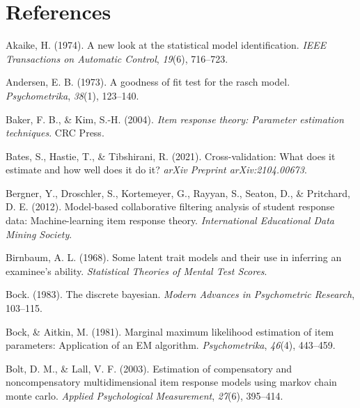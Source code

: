 \documentclass[
  english,
  man,floatsintext]{apa7}
\newlength{\cslhangindent}
\newlength{\cslentryspacingunit} %
\newenvironment{CSLReferences}[2] %
 {%
  \setlength{\parindent}{0pt}
  \ifodd #1
  \let\oldpar\par
  \def\par{\hangindent=\cslhangindent\oldpar}
  \fi
  \setlength{\parskip}{#2\cslentryspacingunit}
 }%
 {}
\begin{document}
\clearpage

\hypertarget{references}{%
\section{References}\label{references}}

\begingroup
\setlength{\parindent}{-0.5in}
\setlength{\leftskip}{0.5in}

\hypertarget{refs}{}
\begin{CSLReferences}{1}{0}
\leavevmode{}%
Akaike, H. (1974). A new look at the statistical model identification. \emph{IEEE Transactions on Automatic Control}, \emph{19}(6), 716--723.

\leavevmode{}%
Andersen, E. B. (1973). A goodness of fit test for the rasch model. \emph{Psychometrika}, \emph{38}(1), 123--140.

\leavevmode{}%
Baker, F. B., \& Kim, S.-H. (2004). \emph{Item response theory: Parameter estimation techniques}. CRC Press.

\leavevmode{}%
Bates, S., Hastie, T., \& Tibshirani, R. (2021). Cross-validation: What does it estimate and how well does it do it? \emph{arXiv Preprint arXiv:2104.00673}.

\leavevmode{}%
Bergner, Y., Droschler, S., Kortemeyer, G., Rayyan, S., Seaton, D., \& Pritchard, D. E. (2012). Model-based collaborative filtering analysis of student response data: Machine-learning item response theory. \emph{International Educational Data Mining Society}.

\leavevmode{}%
Birnbaum, A. L. (1968). Some latent trait models and their use in inferring an examinee's ability. \emph{Statistical Theories of Mental Test Scores}.

\leavevmode{}%
Bock. (1983). The discrete bayesian. \emph{Modern Advances in Psychometric Research}, 103--115.

\leavevmode{}%
Bock, \& Aitkin, M. (1981). Marginal maximum likelihood estimation of item parameters: Application of an EM algorithm. \emph{Psychometrika}, \emph{46}(4), 443--459.

\leavevmode{}%
Bolt, D. M., \& Lall, V. F. (2003). Estimation of compensatory and noncompensatory multidimensional item response models using markov chain monte carlo. \emph{Applied Psychological Measurement}, \emph{27}(6), 395--414.


\end{CSLReferences}
\end{document}
